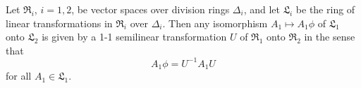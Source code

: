 Let $\mathfrak{R}_i$, $i = 1, 2$, be vector spaces over division rings $\Delta_i$, and let $\mathfrak{L}_i$ be the ring of linear transformations in $\mathfrak{R}_i$ over $\Delta_i$. Then any isomorphism $A_1 \mapsto A_1\phi$ of $\mathfrak{L}_1$ onto $\mathfrak{L}_2$ is given by a 1-1 semilinear transformation $U$ of $\mathfrak{R}_1$ onto $\mathfrak{R}_2$ in the sense that
$$A_1\phi = U^{-1} A_1 U$$
for all $A_1 \in \mathfrak{L}_1$.
